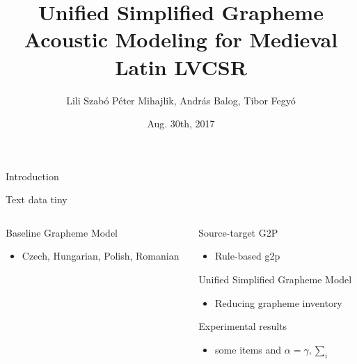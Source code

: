 \documentclass[final,hyperref={pdfpagelabels=false}]{beamer}
\title[Medieval Latin LVCSR]{Unified Simplified Grapheme Acoustic Modeling for Medieval Latin LVCSR}
\author[Lili Szab\'{o} et al.]{Lili Szab{\'o} P\'{e}ter Mihajlik, Andr\'{a}s Balog, Tibor Fegy\'{o}}
\institute[SpeechTex]{SpeechTex}
\date{Aug. 30th, 2017}
\begin{document}
  \begin{frame}{} 
    \vfill
    \begin{block}{\large Introduction}
      \centering
    \end{block}
    \vfill
    \vfill
    \begin{block}{\large Text data}
      \centering
      {\tiny tiny}\par
    \end{block}
    \vfill
    \begin{columns}[t]
      \begin{column}{.48\linewidth}
        \begin{block}{Baseline Grapheme Model}
          \begin{itemize}
          \item Czech, Hungarian, Polish, Romanian
          \end{itemize}
        \end{block}
      \end{column}
      \begin{column}{.48\linewidth}
        \begin{block}{Source-target G2P}
          \begin{itemize}
          \item Rule-based g2p
          \end{itemize}
        \end{block}

        \begin{block}{Unified Simplified Grapheme Model}
          \begin{itemize}
          \item Reducing grapheme inventory
          \end{itemize}
        \end{block}

        \begin{block}{Experimental results}
          \begin{itemize}
          \item some items and $\alpha=\gamma, \sum_{i}$
          \end{itemize}
        \end{block}
      \end{column}
    \end{columns}
  \end{frame}
\end{document}
